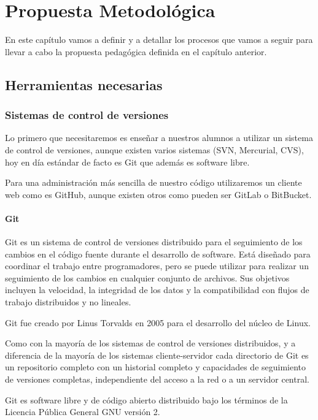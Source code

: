 \chapter{Propuesta Metodológica}

En este capítulo vamos a definir y a detallar los procesos que vamos a seguir para llevar a cabo la propuesta pedagógica definida en el capítulo anterior.

\section{Herramientas necesarias}

\subsection{Sistemas de control de versiones}

Lo primero que necesitaremos es enseñar a nuestros alumnos a utilizar un sistema de control de versiones, aunque existen varios sistemas (SVN, Mercurial, CVS), hoy en día estándar de facto es Git que además es software libre.

Para una administración más sencilla de nuestro código utilizaremos un cliente web como es GitHub, aunque existen otros como pueden ser GitLab o BitBucket.

\subsubsection {Git}

Git es un sistema de control de versiones distribuido para el seguimiento de los cambios en el código fuente durante el desarrollo de software. Está diseñado para coordinar el trabajo entre programadores, pero se puede utilizar para realizar un seguimiento de los cambios en cualquier conjunto de archivos.  Sus objetivos incluyen la velocidad, la integridad de los datos y la compatibilidad con flujos de trabajo distribuidos y no lineales.

Git fue creado por Linus Torvalds en 2005 para el desarrollo del núcleo de Linux.

Como con la mayoría de los sistemas de control de versiones distribuidos, y a diferencia de la mayoría de los sistemas cliente-servidor cada directorio de Git es un repositorio completo con un historial completo y capacidades de seguimiento de versiones completas, independiente del acceso a la red o a un servidor central.

Git es software libre y de código abierto distribuido bajo los términos de la Licencia Pública General GNU versión 2.

